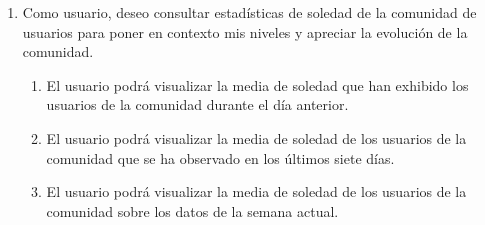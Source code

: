         \begin{enumerate}[resume=req-usuario,label=\textbf{\texttt{RU-\arabic*}}]
            \item \label{req:usuario:comunidad_soledad}  Como usuario, deseo consultar estadísticas de soledad de la comunidad de usuarios para poner en contexto mis niveles y apreciar la evolución de la comunidad.
            \begin{enumerate}[resume=req-funcionales,label=\textbf{\texttt{RF-\arabic*}}]
                \item \label{req:funcionales:comunidad_soledad_dia_anterior_ver} El usuario podrá visualizar la media de soledad que han exhibido los usuarios de la comunidad durante el día anterior.
                \item \label{req:funcionales:comunidad_soledad_siete_dias_ver} El usuario podrá visualizar la media de soledad de los usuarios de la comunidad que se ha observado en los últimos siete días.
                \item \label{req:funcionales:comunidad_soledad_semana_actual_ver} El usuario podrá visualizar la media de soledad de los usuarios de la comunidad sobre los datos de la semana actual.
            \end{enumerate}
        \end{enumerate}
            
